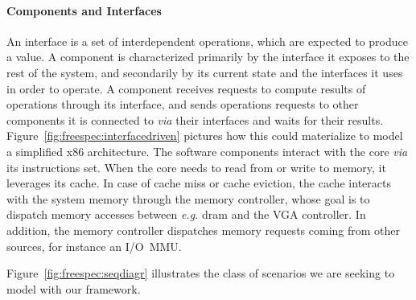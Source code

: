 \paragraph{Components and Interfaces}
%
An interface is a set of interdependent operations, which are expected to
produce a value.
%
A component is characterized primarily by the interface it exposes to the rest
of the system, and secondarily by its current state and the interfaces it uses
in order to operate.
%
A component receives requests to compute results of operations through its
interface, and sends operations requests to other components it is connected to
\emph{via} their interfaces and waits for their results.
%
Figure~\ref{fig:freespec:interfacedriven} pictures how this could materialize to
model a simplified x86 architecture.
%
The software components interact with the core \emph{via} its instructions set.
%
When the core needs to read from or write to memory, it leverages its cache.
%
In case of cache miss or cache eviction, the cache interacts with the system
memory through the memory controller, whose goal is to dispatch memory accesses
between \emph{e.g.} \ac{dram} and the VGA controller.
%
In addition, the memory controller dispatches memory requests coming from other
sources, for instance an I/O~MMU.

Figure~\ref{fig:freespec:seqdiagr} illustrates the class of scenarios we are
seeking to model with our framework.

